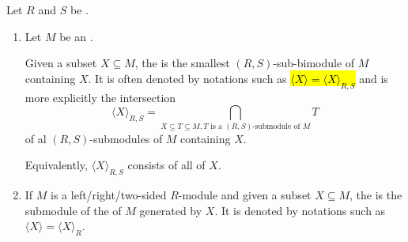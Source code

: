 \begin{definition} \label{definition:submodule_of_a_module_generated_by_elements}
    Let $R$ and $S$ be . 
    \begin{enumerate}
        \item 
        Let $M$ be an .

        Given a subset $X \subseteq M$, the  is the smallest $(R,S)$-sub-bimodule of $M$ containing $X$. It is often denoted by notations such as \hl{$\langle X \rangle = \langle X \rangle_{R,S}$} and is more explicitly the intersection
        $$\langle X \rangle_{R,S} = \bigcap_{X \subseteq T \subseteq M, T \text{ is a } (R,S)\text{-submodule of } M} T$$
        of al $(R,S)$-submodules of $M$ containing $X$. 
        
        Equivalently, $\langle X \rangle_{R,S}$ consists of all  of $X$. 

        \item If $M$ is a left/right/two-sided $R$-module and given a subset $X \subseteq M$, the  is the submodule of the  of $M$ generated by $X$. It is denoted by notations such as $\langle X \rangle = \langle X \rangle_R$. 
    \end{enumerate}
\end{definition}